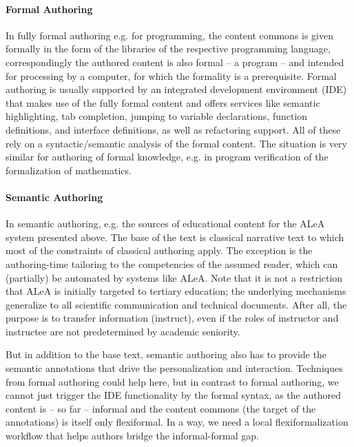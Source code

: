 \documentclass{llncs}
\newcommand\ALeA{\textsf{ALeA}\xspace}
\begin{document}
\paragraph{Formal Authoring}
In fully formal authoring e.g. for programming, the content commons is given formally in
the form of the libraries of the respective programming language, correspondingly the
authored content is also formal -- a program -- and intended for processing by a computer,
for which the formality is a prerequisite. Formal authoring is usually supported by an
integrated development environment (IDE) that makes use of the fully formal content and
offers services like semantic highlighting, tab completion, jumping to variable
declarations, function definitions, and interface definitions, as well as refactoring
support. All of these rely on a syntactic/semantic analysis of the formal content. The
situation is very similar for authoring of formal knowledge, e.g. in program verification
of the formalization of mathematics.

\paragraph{Semantic Authoring}
In semantic authoring, e.g. the \sTeX sources of educational content for the \ALeA system
presented above. The base of the text is classical narrative text to which most of the
constraints of classical authoring apply. The exception is the authoring-time tailoring to
the competencies of the assumed reader, which can (partially) be automated by systems like
\ALeA. Note that it is not a restriction that \ALeA is initially targeted to tertiary
education; the underlying mechanisms generalize to all scientific communication and
technical documents. After all, the purpose is to transfer information (instruct), even if
the roles of instructor and instructee are not predetermined by academic seniority.

But in addition to the base text, semantic authoring also has to provide the semantic
annotations that drive the personalization and interaction. Techniques from formal
authoring could help here, but in contrast to formal authoring, we cannot just trigger the
IDE functionality by the formal syntax, as the authored content is -- so far -- informal
and the content commons (the target of the annotations) is itself only flexiformal. In a
way, we need a local flexiformalization workflow that helps authors bridge the
informal-formal gap.
\end{document}
